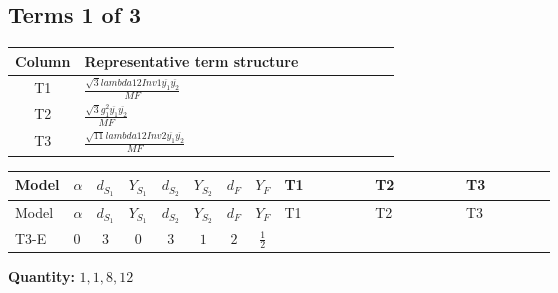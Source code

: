 \documentclass[8pt]{article}
\begin{document}
\begin{landscape}
\subsection*{Terms 1 of 3}
\begin{center}
\begin{tabular}{@{}c >{\raggedright\arraybackslash}p{0.82\linewidth}@{}}
\toprule
Column & Representative term structure \\
\midrule
T1 & \(\displaystyle \frac{\sqrt{3} lambda12Inv1 \overline{y_{1}} \overline{y_{2}}}{MF}\) \\
\midrule
T2 & \(\displaystyle \frac{\sqrt{3} g_{1}^{2} \overline{y_{1}} \overline{y_{2}}}{MF}\) \\
\midrule
T3 & \(\displaystyle \frac{\sqrt{11} lambda12Inv2 \overline{y_{1}} \overline{y_{2}}}{MF}\) \\
\midrule
\bottomrule
\end{tabular}
\end{center}
\smallskip
\tiny
\begin{longtable}{@{}llcccccc >{\raggedright\arraybackslash}p{0.21\linewidth} >{\raggedright\arraybackslash}p{0.21\linewidth} >{\raggedright\arraybackslash}p{0.21\linewidth}@{}}
\toprule
Model & $\alpha$ & $d_{S_1}$ & $Y_{S_1}$ & $d_{S_2}$ & $Y_{S_2}$ & $d_F$ & $Y_F$ & T1 & T2 & T3 \\
\midrule
\endfirsthead
\toprule
Model & $\alpha$ & $d_{S_1}$ & $Y_{S_1}$ & $d_{S_2}$ & $Y_{S_2}$ & $d_F$ & $Y_F$ & T1 & T2 & T3 \\
\midrule
\endhead
T3-E & $0$ & $3$ & $0$ & $3$ & $1$ & $2$ & $\frac{1}{2}$ & \scriptsize\adjustbox{max width=\linewidth}{$\begin{gathered} - \frac{\sqrt{3} lambda12Inv1 \overline{y_{1}} \overline{y_{2}}}{6 MF}\end{gathered}$} & \scriptsize\adjustbox{max width=\linewidth}{$\begin{gathered} \frac{\sqrt{3} g_{1}^{2} \overline{y_{1}} \overline{y_{2}}}{8 MF}\end{gathered}$} & \scriptsize\adjustbox{max width=\linewidth}{$\begin{gathered} \frac{3 \sqrt{11} lambda12Inv2 \overline{y_{1}} \overline{y_{2}}}{22 MF}\end{gathered}$} \\
\midrule
\bottomrule
\end{longtable}
\clearpage
\noindent\textbf{Quantity: }$\mathrm{1,1,8,12}$\par\smallskip

\end{landscape}
\end{document}
